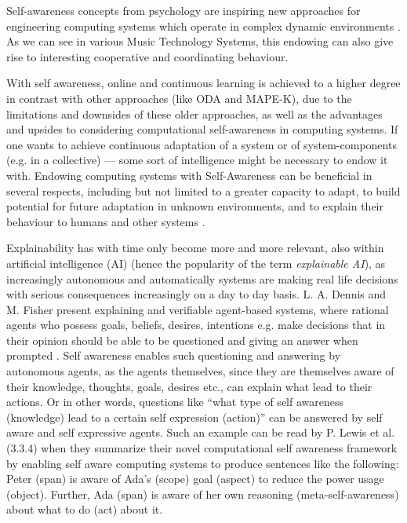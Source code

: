 
Self-awareness concepts from psychology are inspiring new approaches for engineering computing systems which operate in complex dynamic environments \cite{sacs16_ch2}. As we can see in various Music Technology Systems, this endowing can also give rise to interesting cooperative and coordinating behaviour.

With self awareness, online and continuous learning is achieved to a higher degree in contrast with other approaches (like ODA and MAPE-K), due to the limitations and downsides of these older approaches, as well as the advantages and upsides to considering computational self-awareness in computing systems. If one wants to achieve continuous adaptation of a system or of system-components (e.g. in a collective) — some sort of intelligence might be necessary to endow it with. Endowing computing systems with Self-Awareness can be beneficial in several respects, including but not limited to a greater capacity to adapt, to build potential for future adaptation in unknown environments, and to explain their behaviour to humans and other systems \cite{sacs17_ch3}.

Explainability has with time only become more and more relevant, also within artificial intelligence (AI) (hence the popularity of the term \textit{explainable AI}), as increasingly autonomous and automatically systems are making real life decisions with serious consequences increasingly on a day to day basis. L. A. Dennis and M. Fisher present explaining and verifiable agent-based systems, where rational agents who possess goals, beliefs, desires, intentions e.g. make decisions that in their opinion should be able to be questioned and giving an answer when prompted \cite{verifiable_and_questionable_agents}. Self awareness enables such questioning and answering by autonomous agents, as the agents themselves, since they are themselves aware of their knowledge, thoughts, goals, desires etc., can explain what lead to their actions. Or in other words, questions like ``what type of self awareness \cite{sacs16_ch2} (knowledge) lead to a certain self expression \cite{sacs16_ch2} (action)'' can be answered by self aware and self expressive agents. Such an example can be read by P. Lewis et al. \cite{sacs17_ch3} (3.3.4) when they summarize their novel computational self awareness framework by enabling self aware computing systems to produce sentences like the following: Peter (span) is aware of Ada's (scope) goal (aspect) to reduce the power usage (object). Further, Ada (span) is aware of her own reasoning (meta-self-awareness) about what to do (act) about it.

